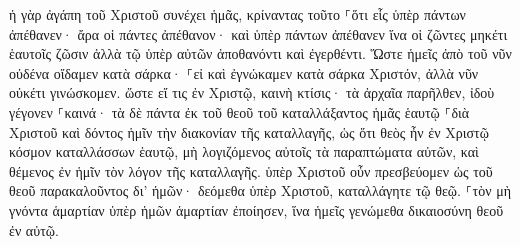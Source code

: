 \documentclass{openreader}
\begin{document}
ἡ γὰρ ἀγάπη τοῦ Χριστοῦ συνέχει ἡμᾶς, κρίναντας τοῦτο ⸀ὅτι εἷς ὑπὲρ πάντων ἀπέθανεν· ἄρα οἱ πάντες ἀπέθανον· 
καὶ ὑπὲρ πάντων ἀπέθανεν ἵνα οἱ ζῶντες μηκέτι ἑαυτοῖς ζῶσιν ἀλλὰ τῷ ὑπὲρ αὐτῶν ἀποθανόντι καὶ ἐγερθέντι. 
Ὥστε ἡμεῖς ἀπὸ τοῦ νῦν οὐδένα οἴδαμεν κατὰ σάρκα· ⸀εἰ καὶ ἐγνώκαμεν κατὰ σάρκα Χριστόν, ἀλλὰ νῦν οὐκέτι γινώσκομεν. 
ὥστε εἴ τις ἐν Χριστῷ, καινὴ κτίσις· τὰ ἀρχαῖα παρῆλθεν, ἰδοὺ γέγονεν ⸀καινά· 
τὰ δὲ πάντα ἐκ τοῦ θεοῦ τοῦ καταλλάξαντος ἡμᾶς ἑαυτῷ ⸀διὰ Χριστοῦ καὶ δόντος ἡμῖν τὴν διακονίαν τῆς καταλλαγῆς, 
ὡς ὅτι θεὸς ἦν ἐν Χριστῷ κόσμον καταλλάσσων ἑαυτῷ, μὴ λογιζόμενος αὐτοῖς τὰ παραπτώματα αὐτῶν, καὶ θέμενος ἐν ἡμῖν τὸν λόγον τῆς καταλλαγῆς. 
ὑπὲρ Χριστοῦ οὖν πρεσβεύομεν ὡς τοῦ θεοῦ παρακαλοῦντος δι’ ἡμῶν· δεόμεθα ὑπὲρ Χριστοῦ, καταλλάγητε τῷ θεῷ. 
⸀τὸν μὴ γνόντα ἁμαρτίαν ὑπὲρ ἡμῶν ἁμαρτίαν ἐποίησεν, ἵνα ἡμεῖς γενώμεθα δικαιοσύνη θεοῦ ἐν αὐτῷ. 
\end{document}
